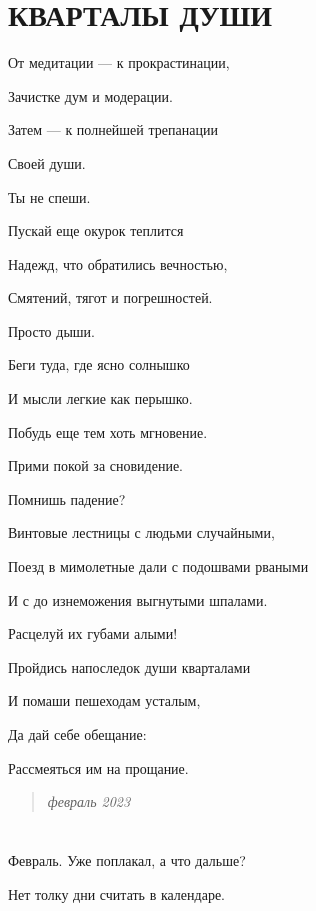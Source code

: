 \documentclass[
  a5paperpaper,
  DIV=11,
  numbers=noendperiod]{scrreprt}
\begin{document}

\section*{КВАРТАЛЫ
ДУШИ}\label{ux43aux432ux430ux440ux442ux430ux43bux44b-ux434ux443ux448ux438}


От медитации --- к прокрастинации,

Зачистке дум и модерации.

Затем --- к полнейшей трепанации

Своей души.

Ты не спеши.

Пускай еще окурок теплится

Надежд, что обратились вечностью,

Смятений, тягот и погрешностей.

Просто дыши.

Беги туда, где ясно солнышко

И мысли легкие как перышко.

Побудь еще тем хоть мгновение.

Прими покой за сновидение.

Помнишь падение?

Винтовые лестницы с людьми случайными,

Поезд в мимолетные дали с подошвами рваными

И с до изнеможения выгнутыми шпалами.

Расцелуй их губами алыми!

Пройдись напоследок души кварталами

И помаши пешеходам усталым,

Да дай себе обещание:

Рассмеяться им на прощание.

\begin{quote}
\emph{февраль 2023}
\end{quote}

\section*{}\label{section-17}

\markright{}

Февраль. Уже поплакал, а что дальше?

Нет толку дни считать в календаре.
\end{document}

